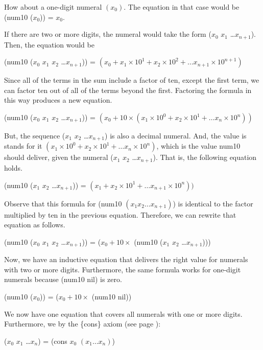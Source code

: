How about a one-digit numeral $(x_0)$.
The equation in that case would be (num10 ($x_0$)) = $x_0$.

If there are two or more digits, the numeral would take the form
($x_0$ $x_1$ \dots $x_{n+1}$).
Then, the equation would be
\begin{center}
(num10 ($x_0$ $x_1$ $x_2$ \dots $x_{n+1}$)) = $(x_0 + x_1 \times 10^1 + x_2 \times 10^2 + \dots x_{n+1} \times 10^{n+1})$
\end{center}

Since all of the terms in the sum include a factor of ten, except the first term,
we can factor ten out of all of the terms beyond the first.
Factoring the formula in this way produces a new equation.
\begin{center}
(num10 ($x_0$ $x_1$ $x_2$ \dots $x_{n+1}$)) = $(x_0 + 10 \times (x_1 \times 10^0 + x_2 \times 10^1 + \dots x_n \times 10^n))$
\end{center}

But, the sequence ($x_1$ $x_2$ \dots $x_{n+1}$) is also a decimal numeral.
And, the value is stands for it $(x_1 \times 10^0 + x_2 \times 10^1 + \dots x_n \times 10^n)$,
which is the value num10 should deliver, given the numeral ($x_1$ $x_2$ \dots $x_{n+1}$).
That is, the following equation holds.
\begin{center}
(num10 ($x_1$ $x_2$ \dots $x_{n+1}$)) = $(x_1 + x_2 \times 10^1 + \dots x_{n+1} \times 10^n))$
\end{center}

Observe that this formula for (num10 $(x_1 x_2 \dots x_{n+1})$) is identical
to the factor multiplied by ten in the previous equation.
Therefore, we can rewrite that equation as follows.
\begin{center}
(num10 ($x_0$ $x_1$ $x_2$ \dots $x_{n+1}$)) = ($x_0 + 10 \times$ (num10 ($x_1$ $x_2$ \dots $x_{n+1}$)))
\end{center}

Now, we have an inductive equation that delivers the right value for
numerals with two or more digits. Furthermore, the same formula works
for one-digit numerals because (num10 nil) is zero.
\begin{center}
(num10 ($x_0$)) = ($x_0 + 10 \times$ (num10 nil))
\end{center}

We now have one equation that covers all numerals with one or more digits.
Furthermore, we by the \{cons\} axiom (see page \pageref{cons-axiom-informal}):
\begin{center}
($x_0$ $x_1$ \dots $x_{n}$) = (cons $x_0$ $(x_1 \dots x_n)$)
\end{center}

